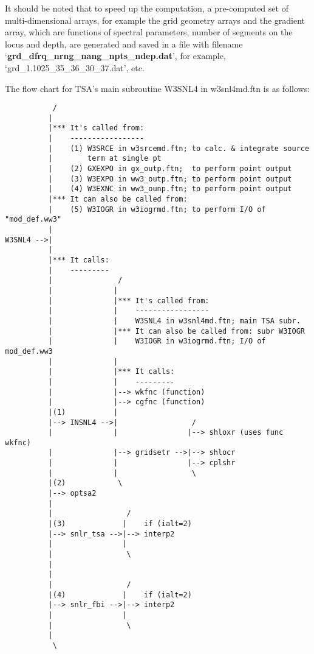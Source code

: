 It should be noted that to speed up the computation, a pre-computed set of multi-dimensional arrays, for example the grid geometry arrays and the gradient array, which are functions of spectral parameters, number of segments on the locus and depth, are generated and saved in a file with filename `\textbf{grd\_dfrq\_nrng\_nang\_npts\_ndep.dat}', for example, `grd\-\_1.1025\-\_35\-\_36\-\_30\-\_37\-.dat', etc.

The flow chart for TSA's main subroutine W3SNL4 in w3snl4md.ftn is as follows:
{\footnotesize 
\begin{verbatim}
           /
          |
          |*** It's called from:
          |    -----------------
          |    (1) W3SRCE in w3srcemd.ftn; to calc. & integrate source
          |        term at single pt
          |    (2) GXEXPO in gx_outp.ftn;  to perform point output
          |    (3) W3EXPO in ww3_outp.ftn; to perform point output
          |    (4) W3EXNC in ww3_ounp.ftn; to perform point output
          |*** It can also be called from:
          |    (5) W3IOGR in w3iogrmd.ftn; to perform I/O of "mod_def.ww3"
          |
W3SNL4 -->| 
          |
          |*** It calls:
          |    ---------
          |               /
          |              |
          |              |*** It's called from:
          |              |    -----------------
          |              |    W3SNL4 in w3snl4md.ftn; main TSA subr.
          |              |*** It can also be called from: subr W3IOGR
          |              |    W3IOGR in w3iogrmd.ftn; I/O of mod_def.ww3
          |              |
          |              |*** It calls:
          |              |    ---------
          |              |--> wkfnc (function)
          |              |--> cgfnc (function)
          |(1)           |
          |--> INSNL4 -->|                 /
          |              |                |--> shloxr (uses func wkfnc)
          |              |--> gridsetr -->|--> shlocr
          |              |                |--> cplshr
          |              |                 \
          |(2)            \
          |--> optsa2
          |
          |                 /
          |(3)             |    if (ialt=2)
          |--> snlr_tsa -->|--> interp2
          |                |
          |                 \
          |
          |
          |                 /
          |(4)             |    if (ialt=2)
          |--> snlr_fbi -->|--> interp2
          |                |
          |                 \
          |
           \ 
\end{verbatim}
 }
